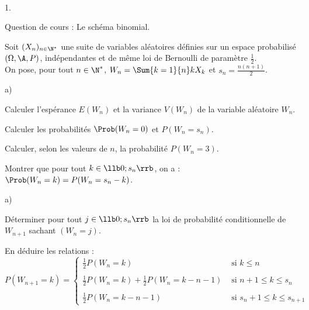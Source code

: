 \documentclass[11pt]{article}%
\begin{document}
\begin{exerciceAP}~\\
  \begin{noliste}{1.}
    \setlength{\itemsep}{2mm}
  \item Question de cours : Le schéma binomial.
  \item Soit $(X_n)_{ n \in \N^* }$ une suite de variables
    aléatoires définies sur un espace probabilisé $(\Omega , \A
    , P )$, indépendantes et de même loi de Bernoulli de paramètre
    $\frac{1}{2}$.\\
    
    On pose, pour tout $n \in \N^*$, $W_n = \Sum{k=1}{n} k
    X_k$ et $s_n = \frac{ n ( n+1 ) }{ 2 }$.

    \begin{noliste}{a)}
    \setlength{\itemsep}{2mm}

    \item Calculer l'espérance $E ( W_n )$ et la variance $V ( W_n )$ de
      la variable aléatoire $W_n$.

    \item Calculer les probabilités $\Prob( W_n = 0)$ et $P ( W_n = s_n)$.

    \item Calculer, selon les valeurs de $n$, la probabilité $P ( W_n = 3 )$.

    \end{noliste}

  \item Montrer que pour tout $k \in \llb 0 ; s_n \rrb$, on a : $\Prob(
    W_n = k ) = P ( W_n = s_n - k )$.

  \item 
    \begin{noliste}{a)}
    \setlength{\itemsep}{2mm}
    \item Déterminer pour tout $j \in \llb 0 ; s_n \rrb$ la loi de
      probabilité conditionnelle de $W_{n+1}$ sachant $(W_n = j)$.
    \item En déduire les relations :
      \[
      P ( W_{n+1} = k ) = \left\{ 
        \begin{array}{ll} 
          \frac{ 1 }{ 2 } P ( W_n = k ) & \text{ si } k \leq n \\ 
          \\ 
          \frac{ 1 }{ 2 } P (W_n = k) + \frac{ 1 }{ 2 }
          P ( W_n = k-n-1) & \text{ si } n+1 \leq k \leq s_n \\ 
          \\
          \frac{ 1 }{ 2 } P ( W_n = k-n-1) & \text{ si } s_n + 1 \leq
          k \leq s_{n+1} 
        \end{array} 
      \right.
      \]
    \end{noliste}
  \end{noliste}
\end{exerciceAP}
\end{document}
